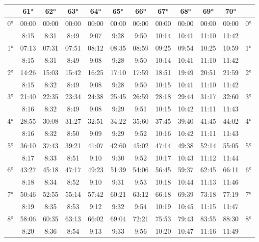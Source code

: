 \begin{scriptsize}\begin{tabular}{c || c | c | c | c | c | c | c | c | c | c || c}
		\space &61°&62°&63°&64°&65°&66°&67°&68°&69°&70°\\\hline\hline
		\multirow{2}{*}{0°}&00:00&00:00&00:00&00:00&00:00&00:00&00:00&00:00&00:00&00:00&\multirow{2}{*}{0°}\\ \space&8:15&8:31&8:49&9:07&9:28&9:50&10:14&10:41&11:10&11:42&\space\\\hline
		\multirow{2}{*}{1°}&07:13&07:31&07:51&08:12&08:35&08:59&09:25&09:54&10:25&10:59&\multirow{2}{*}{1°}\\ \space&8:15&8:31&8:49&9:08&9:28&9:50&10:14&10:41&11:10&11:42&\space\\\hline
		\multirow{2}{*}{2°}&14:26&15:03&15:42&16:25&17:10&17:59&18:51&19:49&20:51&21:59&\multirow{2}{*}{2°}\\ \space&8:15&8:32&8:49&9:08&9:28&9:50&10:15&10:41&11:10&11:42&\space\\\hline
		\multirow{2}{*}{3°}&21:40&22:35&23:34&24:38&25:45&26:59&28:18&29:44&31:17&32:60&\multirow{2}{*}{3°}\\ \space&8:16&8:32&8:49&9:08&9:29&9:51&10:15&10:42&11:11&11:43&\space\\\hline
		\multirow{2}{*}{4°}&28:55&30:08&31:27&32:51&34:22&35:60&37:45&39:40&41:45&44:02&\multirow{2}{*}{4°}\\ \space&8:16&8:32&8:50&9:09&9:29&9:52&10:16&10:42&11:11&11:43&\space\\\hline
		\multirow{2}{*}{5°}&36:10&37:43&39:21&41:07&42:60&45:02&47:14&49:38&52:14&55:05&\multirow{2}{*}{5°}\\ \space&8:17&8:33&8:51&9:10&9:30&9:52&10:17&10:43&11:12&11:44&\space\\\hline
		\multirow{2}{*}{6°}&43:27&45:18&47:17&49:23&51:39&54:06&56:45&59:37&62:45&66:11&\multirow{2}{*}{6°}\\ \space&8:18&8:34&8:52&9:10&9:31&9:53&10:18&10:44&11:13&11:46&\space\\\hline
		\multirow{2}{*}{7°}&50:46&52:55&55:14&57:42&60:21&63:12&66:18&69:39&73:18&77:19&\multirow{2}{*}{7°}\\ \space&8:19&8:35&8:53&9:12&9:32&9:54&10:19&10:45&11:15&11:47&\space\\\hline
		\multirow{2}{*}{8°}&58:06&60:35&63:13&66:02&69:04&72:21&75:53&79:43&83:55&88:30&\multirow{2}{*}{8°}\\ \space&8:20&8:36&8:54&9:13&9:33&9:56&10:20&10:47&11:16&11:49&\space\\\hline

\end{tabular}
\end{scriptsize}
